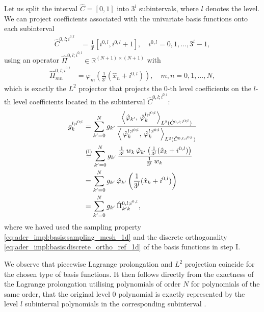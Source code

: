\documentclass{scrreprt}
\theoremstyle{definition}
\theoremstyle{nonumberplain}
\begin{document}
Let us split the interval $\hat{C}=[0,1]$ into ${3}^{l}$ subintervals,
where $l$ denotes the level. We can project coefficients associated
with the univariate basis functions onto each subinterval
\begin{align}
\hat{C}^{0,l;i^{0;l}} &= \frac{1}{3^l}[i^{0,l},i^{0,l}+1],\quad
i^{0,l}=0,1,\ldots,3^l-1,
\end{align}
using an operator $\hat{\Pi}^{0,l;i^{0,l}}\in\mathbb{R}^{(N+1)\times(N+1)}$
with
\begin{align}
\hat{\Pi}^{0,l;i^{0,l}}_{mn}
&=
\varphi_m \left( \frac{1}{3^l} (\hat{x}_n+i^{0,l})\right),
\quad m,n=0,1,\ldots,N,
\end{align}
which is exactly the $L^2$ projector
that projects the $0$-th level coefficients
on the $l$-th level coefficients
located in the subinterval $\hat{C}^{0,l;i^{0;l}}$:
\begin{align}
g^{l;i^{0;l}}_k &=
\sum_{k'=0}^N
g_{k'}\,
\frac{\left \langle
\hat{\varphi}_{k'},
\,\hat{\varphi}^{l;i^{0;l}}_{k}
\right\rangle
_{L^2(\hat{C}^{0,l;i^{0;l}})}}
{\left \langle
\,\hat{\varphi}^{l;i^{0;l}}_{k},
\,\hat{\varphi}^{l;i^{0;l}}_{k}
\right\rangle
_{L^2(\hat{C}^{0,l;i^{0;l}})}}
\notag
\\
&\overset{\textup{(I)}}{=}
\sum_{k'=0}^N
g_{k'}\,
\frac{\frac{1}{3^{l}}\,
w_k\,
\hat{\varphi}_{k'}
\left(
\frac{1}{3^l} (\hat{x}_k+i^{0,l})
\right)}{\frac{1}{3^{l}}\,
w_k\,}
\notag
\\
&=
\sum_{k'=0}^N
g_{k'}\,
\hat{\varphi}_{k'}
\left(
\frac{1}{3^l} (\hat{x}_k+i^{0,l})
\right)
\notag
\\
&=
\sum_{k'=0}^N
g_{k'}\,
\hat{\Pi}^{0,l;i^{0,l}}_{k'k},
\end{align}
where we haved used the sampling property \eqref{eq:ader_impl:basis:sampling_mesh_1d}
and the discrete orthogonality 
\eqref{eq:ader_impl:basis:discrete_ortho_ref_1d}
of the basis functions in step I.

We observe that piecewise Lagrange prolongation and $L^2$ projection
coincide for the chosen type of basis functions.
It then follows directly from the exactness of the Lagrange prolongation
utilising polynomials of order $N$ for polynomials of the same order,
that the original level $0$ polynomial is exactly represented by the
level $l$ subinterval polynomials in the corresponding subinterval
\cite{???}.
\end{document}
